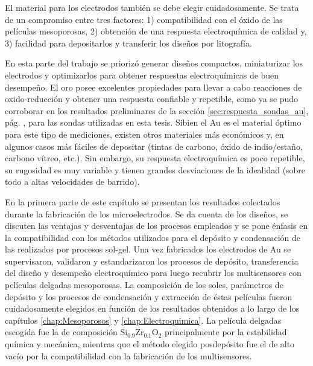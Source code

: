 	El material para los electrodos también se debe elegir cuidadosamente. Se trata de un compromiso entre tres factores: 1) compatibilidad con el óxido de las películas mesoporosas, 2) obtención de una respuesta electroquímica de calidad y, 3) facilidad para depositarlos y transferir los diseños por litografía.

	En esta parte del trabajo se priorizó generar diseños compactos, miniaturizar los electrodos y optimizarlos para obtener respuestas electroquímicas de buen desempeño. El oro posee excelentes propiedades para llevar a cabo reacciones de oxido-reducción y obtener una respuesta confiable y repetible, como ya se pudo corroborar en los resultados preliminares de la sección \ref{sec:respuesta_sondas_au}, pág. \pageref{sec:respuesta_sondas_au}, para las sondas utilizadas en esta tesis. Si\space bien el Au es el material óptimo para este tipo de mediciones, existen otros materiales más económicos y, en algunos casos más fáciles de depositar (tintas de carbono, óxido de indio/estaño, carbono vítreo, etc.). Sin embargo, su respuesta electroquímica es poco repetible, su rugosidad es muy variable y tienen grandes desviaciones de la idealidad (sobre todo a altas velocidades de barrido).\cite{Wi2000,Villullas2000}

	En la primera parte de este capítulo se presentan los resultados colectados durante la fabricación de los microelectrodos. Se da cuenta de los diseños, se discuten las ventajas y desventajas de los procesos empleados y se pone énfasis en la compatibilidad con los métodos utilizados para el depósito y condensación de las \pdm\space realizados por procesos sol-gel. 
	Una vez fabricados los electrodos de Au se supervisaron, validaron y estandarizaron los procesos de depósito, transferencia del diseño y desempeño electroquímico para luego recubrir los multisensores con películas delgadas mesoporosas. La composición de los soles, parámetros de depósito y los procesos de condensación y extracción de éstas películas fueron cuidadosamente elegidos en función de los resultados obtenidos a lo largo de los capítulos \ref{chap:Mesoporosos} y \ref{chap:Electroquimica}. La película delgadas escogida fue la de composición Si$_{0.9}$Zr$_{0.1}$O$_2$ principalmente por la estabilidad química y mecánica, mientras que el método elegido posdepósito fue el de alto vacío por la compatibilidad con la fabricación de los multisensores.

